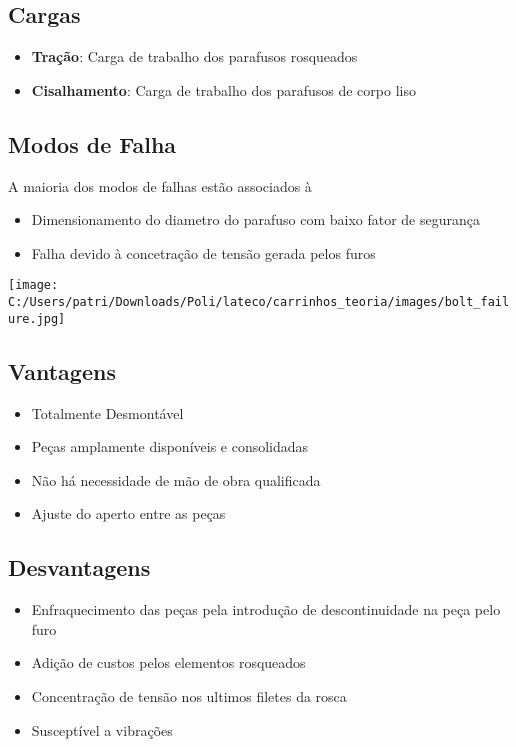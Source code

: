 \subsection{Cargas}

\begin{itemize}
	\item \textbf{Tração}: Carga de trabalho dos parafusos rosqueados
	\item \textbf{Cisalhamento}: Carga de trabalho dos parafusos de corpo liso
\end{itemize}

\subsection{Modos de Falha}

A maioria dos modos de falhas estão associados à

\begin{itemize}
	\item Dimensionamento do diametro do parafuso com baixo fator de segurança
	\item Falha devido à concetração de tensão gerada pelos furos
\end{itemize}

\begin{center}
\texttt{[image: C:/Users/patri/Downloads/Poli/lateco/carrinhos\_teoria/images/bolt\_failure.jpg]}
\end{center}

\subsection{Vantagens}

\begin{itemize}
	\item Totalmente Desmontável
	\item Peças amplamente disponíveis e consolidadas
	\item Não há necessidade de mão de obra qualificada
	\item Ajuste do aperto entre as peças
\end{itemize}

\subsection{Desvantagens}

\begin{itemize}
	\item Enfraquecimento das peças pela introdução de descontinuidade na peça pelo furo
	\item Adição de custos pelos elementos rosqueados
	\item Concentração de tensão nos ultimos filetes da rosca
	\item Susceptível a vibrações
\end{itemize}


